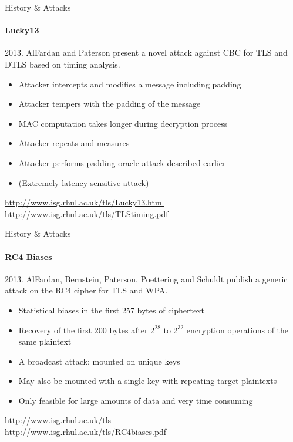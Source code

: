 \documentclass[hyperref={draft}]{beamer}
\begin{document}
\begin{frame}{History \& Attacks}
  \framesubtitle{Lucky13}
  2013. AlFardan and Paterson present a novel attack against CBC for TLS and DTLS based on timing analysis.
  \begin{itemize}
    \item Attacker intercepts and modifies a message including padding
    \item Attacker tempers with the padding of the message
    \item MAC computation takes longer during decryption process
    \item Attacker repeats and measures
    \item Attacker performs padding oracle attack described earlier
    \item (Extremely latency sensitive attack)
  \end{itemize}

  \vspace{50px}

  \tiny
  \url{http://www.isg.rhul.ac.uk/tls/Lucky13.html}\\
  \url{http://www.isg.rhul.ac.uk/tls/TLStiming.pdf}
\end{frame}

\begin{frame}{History \& Attacks}
  \framesubtitle{RC4 Biases}
  2013. AlFardan, Bernstein, Paterson, Poettering and Schuldt publish a generic attack on the RC4 cipher for TLS and WPA.
  \begin{itemize}
    \item Statistical biases in the first 257 bytes of ciphertext
    \item Recovery of the first 200 bytes after $2^{28}$ to $2^{32}$ encryption operations of the same plaintext
    \item A broadcast attack: mounted on unique keys
    \item May also be mounted with a single key with repeating target plaintexts
    \item Only feasible for large amounts of data and very time consuming
  \end{itemize}
  
  \vspace{20px}

  \tiny
  \url{http://www.isg.rhul.ac.uk/tls}\\
  \url{http://www.isg.rhul.ac.uk/tls/RC4biases.pdf}
\end{frame}
\end{document}
